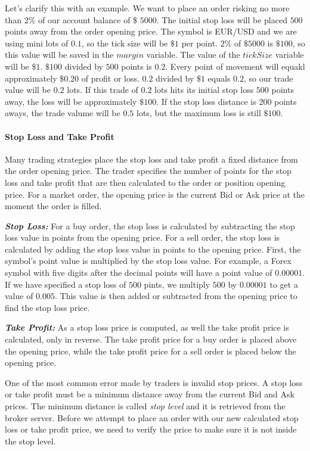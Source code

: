 Let's clarify this with an example. We want to place an order risking no more than $2\%$ of our account balance of \$ $5000$. The initial stop loss will be placed $500$ points away from the order opening price. The symbol is EUR/USD and we are using mini lots of $0.1$, so the tick size will be $\$1$ per point. $2\%$ of $\$5000$ is $\$100$, so this value will be saved in the $margin$ variable. The value of the $tickSize$ variable will be $\$1$.
$\$100$ divided by $500$ points is $0.2$. Every point of movement will equakl approximately $\$0.20$ of profit or loss. $0.2$ divided by $\$1$ equals $0.2$, so our trade value will be $0.2$ lots. If this trade of $0.2$ lots hits its initial stop loss $500$ points away, the loss will be approximately $\$100$. If the stop loss distance is $200$ points aways, the trade valume will be $0.5$ lots, but the maximum loss is still $\$100$.

\paragraph{\textbf{Stop Loss and Take Profit}}\mbox{}

Many trading strategies place the stop loss and take profit a fixed distance from the order opening price. The trader specifies the number of points for the stop loss and take profit that are then calculated to the order or position opening price. For a market order, the opening price is the current Bid or Ask price at the moment the order is filled.

\textit{\textit{\textbf{Stop Loss:}}} For a buy order, the stop loss is calculated by subtracting the stop loss value in points from the opening price. For a sell order, the stop loss is calculated by adding the stop loss value in points to the opening price.
First, the symbol's point value is multiplied by the stop loss value. For example, a Forex symbol with five digits after the decimal points will have a point value of $0.00001$. If we have specified a stop loss of $500$ pints, we multiply $500$ by $0.00001$ to get a value of $0.005$. This value is then added or subtracted from the opening price to find the stop loss price.

\textit{\textit{\textbf{Take Profit:}}} As a stop loss price is computed, as well the take profit price is calculated, only in reverse. The take profit price for a buy order is placed above the opening price, while the take profit price for a sell order is placed below the opening price.

One of the most common error made by traders is invalid stop prices. A stop loss or take profit must be a minimum distance away from the current Bid and Ask prices. The minimum distance is called \textit{stop level} and it is retrieved from the broker server. Before we attempt to place an order with our new calculated stop loss or take profit price, we need to verify the price to make sure it is not inside the stop level.

